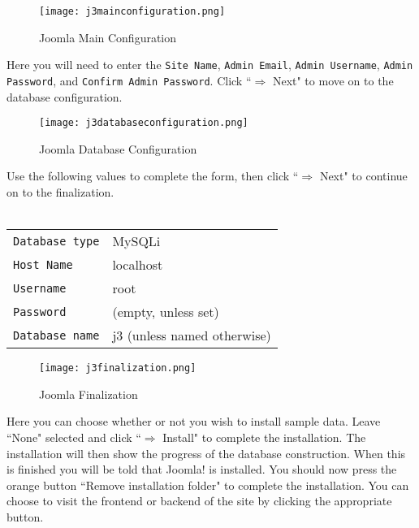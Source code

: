 \begin{figure}[h] 
	\centering
	\texttt{[image: j3mainconfiguration.png]}
	\caption{Joomla Main Configuration}
	\label{fig:j3mainconfiguration}
\end{figure}

\noindent
Here you will need to enter the \texttt{Site Name}, \texttt{Admin Email}, \texttt{Admin Username}, \texttt{Admin Password}, and \texttt{Confirm Admin Password}. Click ``$\Rightarrow$ Next" to move on to the database configuration.\\

\begin{figure}[h] 
	\centering
	\texttt{[image: j3databaseconfiguration.png]}
	\caption{Joomla Database Configuration}
	\label{fig:j3databaseconfiguration}
\end{figure}

\noindent
Use the following values to complete the form, then click ``$\Rightarrow$ Next" to continue on to the finalization.\\
\\
\begin{tabular}{l l}
	\texttt{Database type} & MySQLi\\
	\texttt{Host Name} & localhost\\
	\texttt{Username} & root\\
	\texttt{Password} & (empty, unless set)\\
	\texttt{Database name} & j3 (unless named otherwise)\\
\end{tabular}

\newpage

\begin{figure}[h]
	\centering
	\texttt{[image: j3finalization.png]}
	\caption{Joomla Finalization}
	\label{fig:j3finalization}
\end{figure}

\noindent
Here you can choose whether or not you wish to install sample data. Leave ``None" selected and click ``$\Rightarrow$ Install" to complete the installation. The installation will then show the progress of the database construction. When this is finished you will be told that Joomla! is installed. You should now press the orange button ``Remove installation folder" to complete the installation. You can choose to visit the frontend or backend of the site by clicking the appropriate button.
